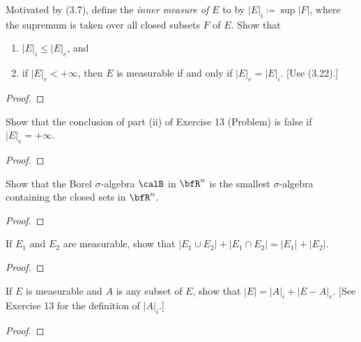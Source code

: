 \begin{problem}
Motivated by (3.7), define the \emph{inner measure of $E$} to by
$\left|E\right|_i\coloneqq\sup\left|F\right|$, where the supremum is taken
over all closed subsets $F$ of $E$. Show that
\begin{enumerate}[label=(\roman*)]
\item $\left|E\right|_i\leq\left|E\right|_e$, and
\item if $\left|E\right|_e<+\infty$, then $E$ is measurable if and only if
  $\left|E\right|_e=\left|E\right|_i$. [Use (3.22).]
\end{enumerate}

\end{problem}
\begin{proof}
\end{proof}
\newpage

\begin{problem}
Show that the conclusion of part  (ii) of Exercise 13 (Problem) is false if
$\left|E\right|_e=+\infty$.
\end{problem}
\begin{proof}
\end{proof}
\newpage

\begin{problem}
Show that the Borel $\sigma$-algebra $\calB$ in $\bfR^n$ is the smallest
$\sigma$-algebra containing the closed sets in $\bfR^n$.
\end{problem}
\begin{proof}
\end{proof}
\newpage

\begin{problem}
If $E_1$ and $E_2$ are measurable, show that $\left|E_1\cup
  E_2\right|+\left|E_1\cap E_2\right|=\left|E_1\right|+\left|E_2\right|$.
\end{problem}
\begin{proof}
\end{proof}
\newpage

\begin{problem}
If $E$ is measurable and $A$ is any subset of $E$, show that
$\left|E\right|=\left|A\right|_i+\left|E\minus A\right|_e$. [See Exercise
13 for the definition of $\left|A\right|_i$.]
\end{problem}
\begin{proof}
\end{proof}
\newpage

